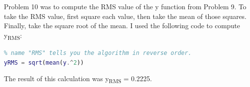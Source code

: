 \documentclass{article}
\begin{document}
\section{}

Problem 10 was to compute the RMS value of the y function from Problem 9.  To take the RMS value, first square each value, then take the mean of those squares.  Finally, take the square root of the mean.  I used the following code to compute y\textsubscript{RMS}:

\begin{lstlisting}[language=Matlab]
% Compute the RMS value of the signal y from problem 9.  Recall that the 
% name "RMS" tells you the algorithm in reverse order.
yRMS = sqrt(mean(y.^2))
\end{lstlisting}

The result of this calculation was y\textsubscript{RMS} = 0.2225.
\end{document}
